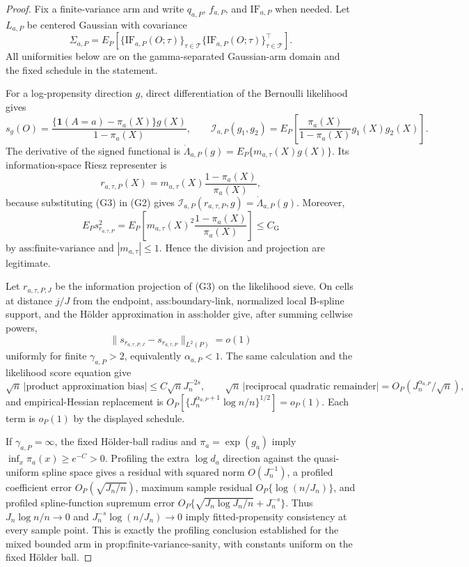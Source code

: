 \documentclass{article}
\begin{document}
\begin{proof}
Fix a finite-variance arm and write \(q_{a,P}\), \(f_{a,P}\), and \(\mathrm{IF}_{a,P}\) when needed.  Let \(L_{a,P}\) be centered Gaussian with covariance
\[
\Sigma_{a,P}=E_P\!\left[
\{\mathrm{IF}_{a,P}(O;\tau)\}_{\tau\in\mathcal T}
\{\mathrm{IF}_{a,P}(O;\tau)\}_{\tau\in\mathcal T}^{\!\top}\right].
\tag{G1}
\]
All uniformities below are on the gamma-separated Gaussian-arm domain and the fixed schedule in the statement.

For a log-propensity direction \(g\), direct differentiation of the Bernoulli likelihood gives
\[
s_g(O)=\frac{\{\mathbf1(A=a)-\pi_a(X)\}g(X)}{1-\pi_a(X)},
\qquad
\mathcal I_{a,P}(g_1,g_2)=E_P\!\left[
\frac{\pi_a(X)}{1-\pi_a(X)}g_1(X)g_2(X)\right].
\tag{G2}
\]
The derivative of the signed functional is \(\dot\Lambda_{a,P}(g)=E_P\{m_{a,\tau}(X)g(X)\}\).  Its information-space Riesz representer is
\[
r_{a,\tau,P}(X)=m_{a,\tau}(X)\frac{1-\pi_a(X)}{\pi_a(X)},
\tag{G3}
\]
because substituting (G3) in (G2) gives \(\mathcal I_{a,P}(r_{a,\tau,P},g)=\dot\Lambda_{a,P}(g)\).  Moreover,
\[
E_Ps_{r_{a,\tau,P}}^2
=E_P\!\left[m_{a,\tau}(X)^2\frac{1-\pi_a(X)}{\pi_a(X)}\right]
\le C_{\mathrm G}
\tag{G4}
\]
by \(\text{ass:finite-variance}\) and \(|m_{a,\tau}|\le1\).  Hence the division and projection are legitimate.

Let \(r_{a,\tau,P,J}\) be the information projection of (G3) on the likelihood sieve.  On cells at distance \(j/J\) from the endpoint, \(\text{ass:boundary-link}\), normalized local B-spline support, and the Hölder approximation in \(\text{ass:holder}\) give, after summing cellwise powers,
\[
\|s_{r_{a,\tau,P,J}}-s_{r_{a,\tau,P}}\|_{L^2(P)}=o(1)
\tag{G5}
\]
uniformly for finite \(\gamma_{a,P}>2\), equivalently \(\alpha_{a,P}<1\).  The same calculation and the likelihood score equation give
\[
\sqrt n\,|\text{product approximation bias}|\le C\sqrt nJ_n^{-2s},
\qquad
\sqrt n\,|\text{reciprocal quadratic remainder}|
=O_P(J_n^{\alpha_{a,P}}/\sqrt n),
\tag{G6}
\]
and empirical-Hessian replacement is
\(O_P[\{J_n^{\alpha_{a,P}+1}\log n/n\}^{1/2}]=o_P(1)\).  Each term is \(o_P(1)\) by the displayed schedule.

If \(\gamma_{a,P}=\infty\), the fixed Hölder-ball radius and \(\pi_a=\exp(g_a)\) imply \(\inf_x\pi_a(x)\ge e^{-C}>0\).  Profiling the extra \(\log d_a\) direction against the quasi-uniform spline space gives a residual with squared norm \(O(J_n^{-1})\), a profiled coefficient error \(O_P(\sqrt{J_n/n})\), maximum sample residual \(O_P\{\log(n/J_n)\}\), and profiled spline-function supremum error
\(O_P\{\sqrt{J_n\log J_n/n}+J_n^{-s}\}\).  Thus \(J_n\log n/n\to0\) and \(J_n^{-s}\log(n/J_n)\to0\) imply fitted-propensity consistency at every sample point.  This is exactly the profiling conclusion established for the mixed bounded arm in \(\text{prop:finite-variance-sanity}\), with constants uniform on the fixed Hölder ball.


\end{proof}
\end{document}
